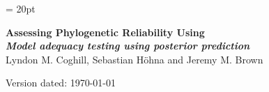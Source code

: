 \documentclass[11pt]{article}
\begin{document}
\renewcommand{\headrulewidth}{0.5pt}
\headsep = 20pt
\lhead{ }

\thispagestyle{plain}
\begin{center}

\textbf{\LARGE Assessing Phylogenetic Reliability Using \RevBayes}\\\vspace{2mm}
\textbf{\it{\Large Model adequacy testing using posterior prediction}}\\\vspace{2mm}
\vspace{1cm}
{\Large Lyndon M. Coghill, Sebastian H{\"o}hna and Jeremy M. Brown}
\vspace{1cm}
\end{center}

\def \ResourcePath {./}
\def \GlobalResourcePath {../}


Version dated: \today
\end{document}
